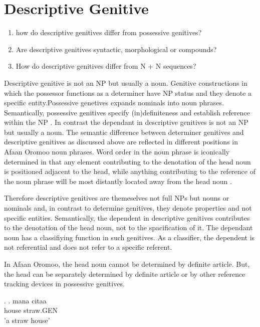 \documentclass[11pt,a4paper]{article}
\begin{document}
	
	
	
	\section{Descriptive Genitive}
	
	
	
	\begin{enumerate}
		\item how do descriptive genitives differ from possessive genitives?
		\item Are descriptive genitives syntactic, morphological or compounds?
		\item How do descriptive genitives differ from N + N sequences?
	\end{enumerate}
	
	Descriptive genitive is not an NP but usually a noun. Genitive constructions in which the possessor functions as a determiner have NP status and they denote a specific entity.Possessive genetives expands nominals into noun phrases. Semantically, possessive genitives specify (in)definiteness and establish reference within the NP \cite[82]{rosenbach2006descriptive}. In contrast the dependant in descriptive genitives is not an NP but usually a noun. The semantic difference between determiner genitives and descriptive genitives as discussed above are reflected in different positions in Afaan Oromoo noun phrases. Word order in the noun phrase is iconically determined in that any element contributing to the denotation of the head noun is positioned adjacent to the head, while anything contributing to the reference of the noun phrase will be most distantly located away from the head noun \cite[81]{rosenbach2006descriptive}.
	
	Therefore descriptive genitives are themeselves not full NPs but nouns or nominals and, in contrast to 	determine genitives, they denote properties and not specific entities. 	Semantically, the dependent in descriptive genitives contributes to the denotation of the head noun, not to the spacification of it. The dependant noun has a classifiying function in such genitives. As a classifier, the dependent is not referential and does not refer to a specific referent. 
	
	In Afaan Oromoo, the head noun cannot be determined by definite article. But, the head can be separately determined by definite article or by other reference tracking devices in possessive genitives.
	
	\ex.
	\ag.
	mana citaa \\
	house straw.GEN\\
	'a straw house'\\
	
\end{document}
